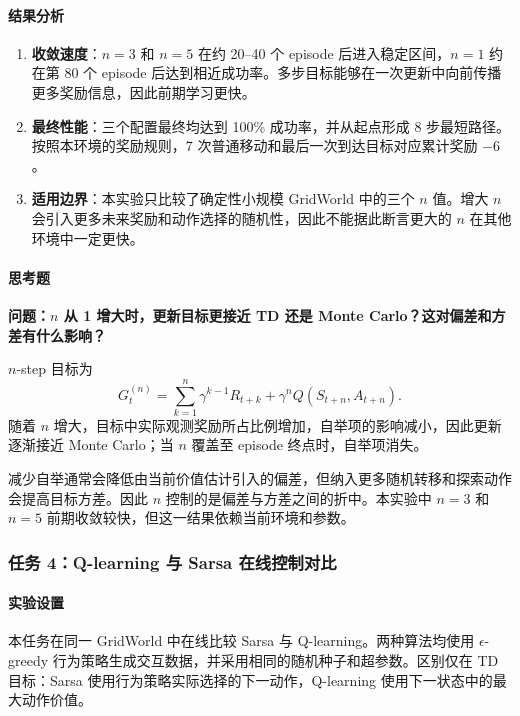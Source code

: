 \documentclass[11pt,a4paper,UTF8]{ctexart}
\numberwithin{figure}{section}
\numberwithin{table}{section}
\newcommand{\answerlabel}{%
  \par\smallskip\noindent{\heiti\bfseries 回答：}\quad}
\newcommand{\question}[1]{\par\smallskip\noindent\textbf{#1}\par}
\begin{document}
\paragraph{结果分析}
\begin{enumerate}
\item \textbf{收敛速度}：$n=3$ 和 $n=5$ 在约 20--40 个 episode 后进入稳定区间，$n=1$ 约在第 80 个 episode 后达到相近成功率。多步目标能够在一次更新中向前传播更多奖励信息，因此前期学习更快。
\item \textbf{最终性能}：三个配置最终均达到 100\% 成功率，并从起点形成 8 步最短路径。按照本环境的奖励规则，7 次普通移动和最后一次到达目标对应累计奖励 $-6$。
\item \textbf{适用边界}：本实验只比较了确定性小规模 GridWorld 中的三个 $n$ 值。增大 $n$ 会引入更多未来奖励和动作选择的随机性，因此不能据此断言更大的 $n$ 在其他环境中一定更快。
\end{enumerate}

\paragraph{思考题}



\question{问题：$n$ 从 1 增大时，更新目标更接近 TD 还是 Monte Carlo？这对偏差和方差有什么影响？}

\answerlabel $n$-step 目标为
\[
G_t^{(n)}=\sum_{k=1}^{n}\gamma^{k-1}R_{t+k}
          +\gamma^n Q(S_{t+n},A_{t+n}).
\]
随着 $n$ 增大，目标中实际观测奖励所占比例增加，自举项的影响减小，因此更新逐渐接近 Monte Carlo；当 $n$ 覆盖至 episode 终点时，自举项消失。

减少自举通常会降低由当前价值估计引入的偏差，但纳入更多随机转移和探索动作会提高目标方差。因此 $n$ 控制的是偏差与方差之间的折中。本实验中 $n=3$ 和 $n=5$ 前期收敛较快，但这一结果依赖当前环境和参数。


\subsubsection{任务 4：Q-learning 与 Sarsa 在线控制对比}

\paragraph{实验设置}
本任务在同一 GridWorld 中在线比较 Sarsa 与 Q-learning。两种算法均使用 $\epsilon$-greedy 行为策略生成交互数据，并采用相同的随机种子和超参数。区别仅在 TD 目标：Sarsa 使用行为策略实际选择的下一动作，Q-learning 使用下一状态中的最大动作价值。
\end{document}
